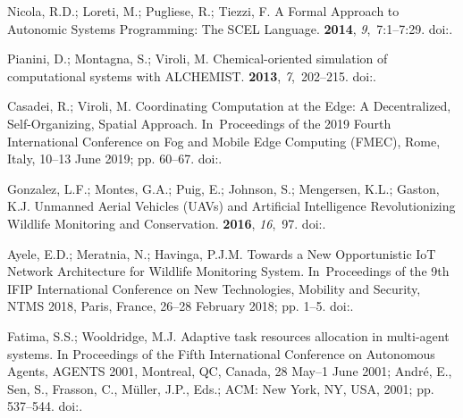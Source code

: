 \documentclass[jsan,article,accept,moreauthors,pdftex]{Definitions/mdpi}
\begin{document}
\begin{thebibliography}{999}
Nicola, R.D.; Loreti, M.; Pugliese, R.; Tiezzi, F.
\newblock A Formal Approach to Autonomic Systems Programming: The {SCEL}
  Language.
 {\bf 2014}, {\em
  9},~7:1--7:29.
\newblock
  doi:{\href{https://doi.org/10.1145/2619998}{}}.

Pianini, D.; Montagna, S.; Viroli, M.
\newblock Chemical-oriented simulation of computational systems with
  {ALCHEMIST}.
 {\bf 2013}, {\em 7},~202--215.
\newblock
  doi:{\href{https://doi.org/10.1057/jos.2012.27}{}}.

Casadei, R.; Viroli, M.
\newblock Coordinating Computation at the Edge: A Decentralized,
  Self-Organizing, Spatial Approach.
\newblock   In~Proceedings of the 2019 Fourth International Conference on Fog and Mobile Edge
  Computing (FMEC), Rome, Italy, 10--13 June 2019; pp. 60--67.
\newblock
  doi:{\href{https://doi.org/10.1109/FMEC.2019.8795355}{}}.

Gonzalez, L.F.; Montes, G.A.; Puig, E.; Johnson, S.; Mengersen, K.L.; Gaston,
  K.J.
\newblock Unmanned Aerial Vehicles (UAVs) and Artificial Intelligence
  Revolutionizing Wildlife Monitoring and Conservation.
 {\bf 2016}, {\em 16},~97.
\newblock
  doi:{\href{https://doi.org/10.3390/s16010097}{}}.

Ayele, E.D.; Meratnia, N.; Havinga, P.J.M.
\newblock Towards a New Opportunistic IoT Network Architecture for Wildlife
  Monitoring System.
\newblock  In~Proceedings of the 9th {IFIP} International Conference on New Technologies, Mobility
  and Security, {NTMS} 2018, Paris, France, 26--28 February 2018; pp. 1--5.
\newblock
  doi:{\href{https://doi.org/10.1109/NTMS.2018.8328721}{}}.

Fatima, S.S.; Wooldridge, M.J.
\newblock Adaptive task resources allocation in multi-agent systems.
\newblock  In Proceedings of the Fifth International Conference on Autonomous
  Agents, {AGENTS} 2001, Montreal, QC, Canada, 28 May--1 June 2001; Andr{\'{e}},
  E., Sen, S., Frasson, C., M{\"{u}}ller, J.P., Eds.; ACM: New York, NY, USA,  2001; pp.
  537--544.
\newblock
  doi:{\href{https://doi.org/10.1145/375735.376439}{}}.


\end{thebibliography}
\end{document}
